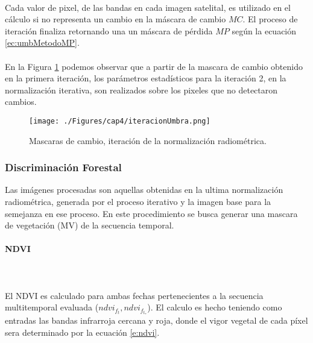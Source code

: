 \\  Cada valor de pixel, de las bandas en cada imagen satelital, es utilizado en el c\'alculo si no representa un cambio en la m\'ascara de cambio $ MC $. El proceso de iteraci\'on finaliza retornando una un m\'ascara de p\'erdida $ MP $ seg\'un la ecuaci\'on \ref{ec:umbMetodoMP}.\\~\\
En la Figura \ref{fig:iteracionRadiometrica} podemos observar que a partir de la mascara de cambio obtenido en la primera iteraci\'on, los par\'ametros estad\'isticos para la iteraci\'on 2, en la normalizaci\'on iterativa, son realizados sobre los pixeles que no detectaron cambios. 
\begin{figure}[H]
	\centering
	\texttt{[image: ./Figures/cap4/iteracionUmbra.png]}
	\caption{Mascaras de cambio, iteraci\'on de la normalizaci\'on radiom\'etrica.}
	\label{fig:iteracionRadiometrica}
\end{figure}


\subsubsection{Discriminaci\'on Forestal}\label{sec:discrForestalMet}
Las im\'agenes procesadas son aquellas obtenidas en la ultima normalizaci\'on radiom\'etrica, generada por el proceso iterativo y la imagen base para la semejanza en ese proceso. En este procedimiento se busca generar una mascara de vegetaci\'on (MV) de la secuencia temporal.
\paragraph{NDVI}\mbox{}\\\mbox{}\\
El NDVI es calculado para ambas fechas pertenecientes a la secuencia multitemporal evaluada ($ndvi_{f_{t}},ndvi_{f_{t_{*}}}  $). El calculo es hecho teniendo como entradas las bandas infrarroja cercana y roja, donde el vigor vegetal de cada p\'ixel sera determinado por la ecuaci\'on \ref{e:ndvi}. 
